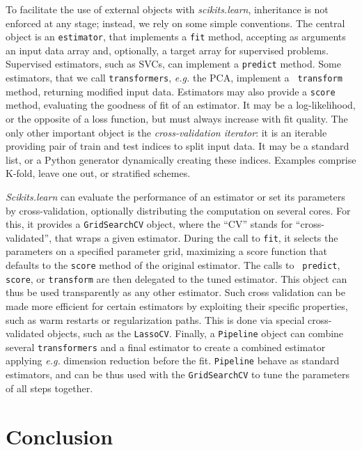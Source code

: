 \documentclass[twoside,11pt]{article}
\begin{document}
%
To facilitate the use of external objects with \emph{scikits.learn},
inheritance is not enforced at any stage; instead, we rely on some simple
conventions. The central object is an {\tt estimator}, that implements a
{\tt fit} method, accepting as arguments an input data array and,
optionally, a target array for supervised problems. Supervised estimators,
such as SVCs, can implement a {\tt predict} method. Some estimators,
that we call {\tt transformers}, \emph{e.g.} the PCA, implement a {\tt
transform} method, returning modified input data.
%
Estimators may also provide a {\tt score} method, evaluating the goodness
of fit of an estimator. It may be a log-likelihood, or the opposite of a
loss function, but must always increase with fit quality.
%
The only other important object is the \emph{cross-validation iterator}:
it is an iterable providing pair of train and test indices to split input
data. It may be a standard list, or a Python generator dynamically
creating these indices. Examples comprise K-fold, leave one out, or
stratified schemes. 


\smallskip {}
%
\emph{Scikits.learn} can evaluate the performance of an estimator or set
its parameters by cross-validation, optionally distributing the
computation on several cores. For this, it provides a {\tt GridSearchCV}
object, where the ``CV'' stands for ``cross-validated'', that wraps a
given estimator. During the call to {\tt fit}, it selects the parameters
on a specified parameter grid, maximizing a score function that defaults
to the {\tt score} method of the original estimator. The calls to {\tt
predict}, {\tt score}, or {\tt transform} are then delegated to the tuned
estimator. This object can thus be used transparently as any other
estimator. Such cross validation can be made more efficient for certain
estimators by exploiting their specific properties, such as warm restarts
or regularization paths. This is done via special cross-validated
objects, such as the {\tt LassoCV}. Finally, a {\tt Pipeline} object can
combine several {\tt transformers} and a final estimator to create a
combined estimator applying \emph{e.g.} dimension reduction before the
fit. {\tt Pipeline} behave as standard estimators, and can be thus used
with the {\tt GridSearchCV} to tune the parameters of all steps together.

\section{Conclusion}
\end{document}
